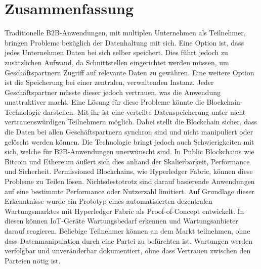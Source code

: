 \pagestyle{empty} %

\chapter*{Zusammenfassung} %
\label{cha:abtract}

Traditionelle B2B-Anwendungen, mit multiplen Unternehmen als Teilnehmer, bringen Probleme bezüglich der Datenhaltung mit sich. Eine Option ist, dass jedes Unternehmen Daten bei sich selber speichert. Dies führt jedoch zu zusätzlichen Aufwand, da Schnittstellen eingerichtet werden müssen, um Geschäftspartnern Zugriff auf relevante Daten zu gewähren. Eine weitere Option ist die Speicherung bei einer zentralen, verwaltenden Instanz. Jeder Geschäftspartner müsste dieser jedoch vertrauen, was die Anwendung unattraktiver macht. Eine Lösung für diese Probleme könnte die Blockchain-Technologie darstellen. Mit ihr ist eine verteilte Datenspeicherung unter nicht vertrauenswürdigen Teilnehmern möglich. Dabei stellt die Blockchain sicher, dass die Daten bei allen Geschäftspartnern synchron sind und nicht manipuliert oder gelöscht werden können. Die Technologie bringt jedoch auch Schwierigkeiten mit sich, welche für B2B-Anwendungen unerwünscht sind. In Public Blockchains wie Bitcoin und Ethereum äußert sich dies anhand der Skalierbarkeit, Performance und Sicherheit. Permissioned Blockchains, wie Hyperledger Fabric, können diese Probleme zu Teilen lösen. Nichtsdestotrotz sind darauf basierende Anwendungen auf eine bestimmte Performance oder Nutzerzahl limitiert. Auf Grundlage dieser Erkenntnisse wurde ein Prototyp eines automatisierten dezentralen Wartungsmarktes mit Hyperledger Fabric als Proof-of-Concept entwickelt. In diesen können IoT-Geräte Wartungsbedarf erkennen und Wartungsanbieter darauf reagieren. Beliebige Teilnehmer können an dem Markt teilnehmen, ohne dass Datenmanipulation durch eine Partei zu befürchten ist. Wartungen werden verfolgbar und unveränderbar dokumentiert, ohne dass Vertrauen zwischen den Parteien nötig ist.
